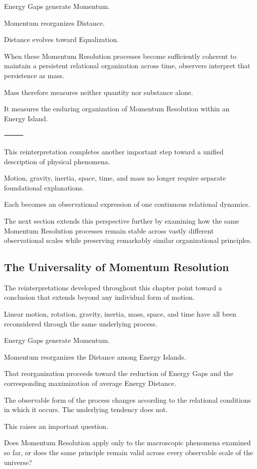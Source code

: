 Energy Gaps generate Momentum.

Momentum reorganizes Distance.

Distance evolves toward Equalization.

When these Momentum Resolution processes become sufficiently coherent to maintain a persistent relational organization across time, observers interpret that persistence as mass.

Mass therefore measures neither quantity nor substance alone.

It measures the enduring organization of Momentum Resolution within an Energy Island.

⸻

This reinterpretation completes another important step toward a unified description of physical phenomena.

Motion, gravity, inertia, space, time, and mass no longer require separate foundational explanations.

Each becomes an observational expression of one continuous relational dynamics.

The next section extends this perspective further by examining how the same Momentum Resolution processes remain stable across vastly different observational scales while preserving remarkably similar organizational principles.

\subsection*{\textbf{The Universality of Momentum Resolution}}


The reinterpretations developed throughout this chapter point toward a conclusion that extends beyond any individual form of motion.

Linear motion, rotation, gravity, inertia, mass, space, and time have all been reconsidered through the same underlying process.

Energy Gaps generate Momentum.

Momentum reorganizes the Distance among Energy Islands.

That reorganization proceeds toward the reduction of Energy Gaps and the corresponding maximization of average Energy Distance.

The observable form of the process changes according to the relational conditions in which it occurs. The underlying tendency does not.

This raises an important question.

Does Momentum Resolution apply only to the macroscopic phenomena examined so far, or does the same principle remain valid across every observable scale of the universe?

